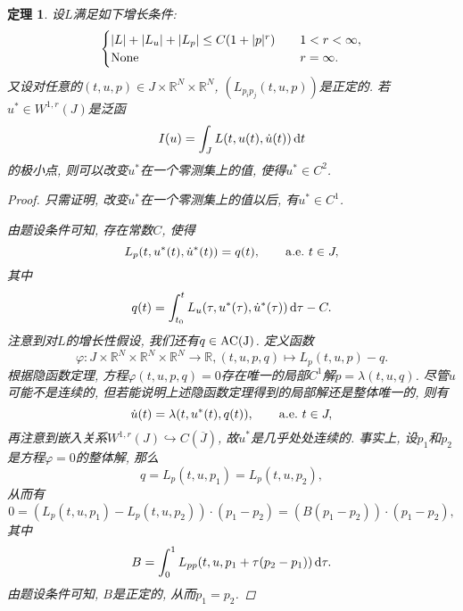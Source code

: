 \documentclass[12pt,a4paper]{article}
\newtheorem{theorem}{定理}[section]
\begin{document}
\begin{theorem}\label{th2.42}
    设$L$满足如下增长条件:
    \begin{equation*}
        \begin{cases}
            |L| + |L_u| + |L_p| \leq C(1 + |p|^r) \quad &1 < r < \infty, \\ 
            {\rm None} \quad &r = \infty.
        \end{cases}
    \end{equation*}
    又设对任意的$(t, u, p) \in J \times \mathbb{R}^N \times \mathbb{R}^N$, $(L_{p_ip_j}(t, u, p))$是正定的.
    若$u^* \in W^{1, r}(J)$是泛函 
    \begin{equation*}
        I(u) = \int_JL(t, u(t), \dot u(t)) \,{\rm d}t
    \end{equation*}
    的极小点, 则可以改变$u^*$在一个零测集上的值, 使得$u^* \in C^2$.
    \begin{proof}
        只需证明, 改变$u^*$在一个零测集上的值以后, 有$u^* \in C^1$.

        由题设条件可知, 存在常数$C$, 使得 
        \begin{equation*}
            L_p(t, u^*(t), \dot u^*(t)) = q(t), \qquad {\rm a.e.}\ t \in J,
        \end{equation*}
        其中 
        \begin{equation*}
            q(t) = \int_{t_0}^tL_u(\tau, u^*(\tau), \dot u^*(\tau)) \,{\rm d}\tau - C.
        \end{equation*}
        注意到对$L$的增长性假设, 我们还有$q \in {\rm AC(J)}$.
        定义函数 
        \begin{equation*}
            \varphi\colon J \times \mathbb{R}^N \times \mathbb{R}^N \times \mathbb{R}^N \rightarrow \mathbb{R}, (t, u, p, q) \mapsto L_p(t, u, p) - q.
        \end{equation*}
        根据隐函数定理, 方程$\varphi(t, u, p, q) = 0$存在唯一的局部$C^1$解$p = \lambda(t, u, q)$.
        尽管$\dot u$可能不是连续的, 但若能说明上述隐函数定理得到的局部解还是整体唯一的, 则有 
        \begin{equation*}
            \dot u(t) = \lambda(t, u^*(t), q(t)), \qquad {\rm a.e.}\ t \in J,
        \end{equation*}
        再注意到嵌入关系$W^{1, r}(J) \hookrightarrow C(\overline{J})$, 故$\dot u^*$是几乎处处连续的. 事实上, 设$p_1$和$p_2$是方程$\varphi = 0$的整体解, 那么 
        \begin{equation*}
            q = L_p(t, u, p_1) = L_p(t, u, p_2),
        \end{equation*}
        从而有 
        \begin{equation*}
            0 = (L_p(t, u, p_1) - L_p(t, u, p_2)) \cdot (p_1 - p_2) = (B(p_1 - p_2)) \cdot (p_1 - p_2),
        \end{equation*}
        其中 
        \begin{equation*}
            B = \int_0^1L_{pp}(t, u, p_1 + \tau(p_2 - p_1)) \,{\rm d}\tau.
        \end{equation*}
        由题设条件可知, $B$是正定的, 从而$p_1 = p_2$.
    \end{proof}
\end{theorem}
\end{document}
